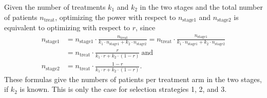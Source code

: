 \documentclass[bimj,fleqn]{w-art}
\theoremstyle{plain}
\theoremstyle{definition}
\begin{document}
Given the number of treatments $k_1$ and $k_2$ in the two stages and the total number of patients $n_{\text{treat}}$, optimizing the power with respect to $n_{\text{stage1}}$ and $n_{\text{stage2}}$ is equivalent to optimizing with respect to $r$, since
\begin{align}
  \label{eq:stagec}
  n_{\text{stage1}} & = 
  n_{\text{stage1}}\cdot \frac{n_{\text{treat}}}{k_1\cdot n_{\text{stage1}}+k_2\cdot n_{\text{stage2}}} = 
  n_{\text{treat}} \cdot \frac{n_{\text{stage1}}}{k_1\cdot n_{\text{stage1}}+k_2\cdot n_{\text{stage2}}} \nonumber \\
  & = n_{\text{treat}}\cdot
  \frac{r}{k_1\cdot
  r+k_2\cdot (1-r)} \ \text{and} \nonumber \\
  n_{\text{stage2}} & =
  n_{\text{treat}}\cdot
  \frac{1-r}{k_1\cdot
  r+k_2\cdot (1-r)}.
\end{align}
These formulas give the numbers of patients per treatment arm in the two stages, if $k_2$ is known. 
This is only the case for selection strategies 1, 2, and 3.
\end{document}
